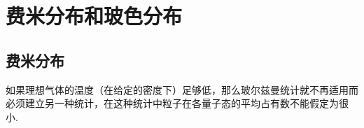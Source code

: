 %
\chapter{费米分布和玻色分布}

\section{费米分布}

如果理想气体的温度（在给定的密度下）足够低，那么玻尔兹曼统计就不再适用而必须建立另一种统计，在这种统计中粒子在各量子态的平均占有数不能假定为很小.

